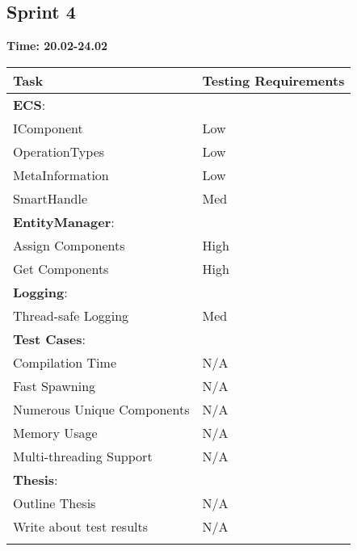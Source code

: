 \documentclass[hidelinks]{article}
\begin{document}
\subsection{Sprint 4}
\textbf{Time: 20.02-24.02}\\
\begin{tabularx}{\textwidth}{l >{\centering\arraybackslash}X}
\hline\noalign{\smallskip}
  Task                          & Testing Requirements   \\
\hline\noalign{\smallskip}
  \textbf{ECS}:                 &                        \\
  IComponent                    & Low                    \\
  OperationTypes                & Low                    \\
  MetaInformation               & Low                    \\ 
  SmartHandle                   & Med                    \\
  
  \textbf{EntityManager}:       &                        \\
  Assign Components             & High                   \\
  Get Components                & High                   \\

  \textbf{Logging}:             &                        \\
  Thread-safe Logging           & Med                    \\

  \textbf{Test Cases}:          &                        \\
  Compilation Time              & N/A                    \\
  Fast Spawning                 & N/A                    \\
  Numerous Unique Components    & N/A                    \\
  Memory Usage                  & N/A                    \\
  Multi-threading Support       & N/A                    \\

  \textbf{Thesis}:              &                        \\
  Outline Thesis                & N/A                    \\
  Write about test results      & N/A                    \\
\hline\noalign{\smallskip}
\end{tabularx}
\end{document}
